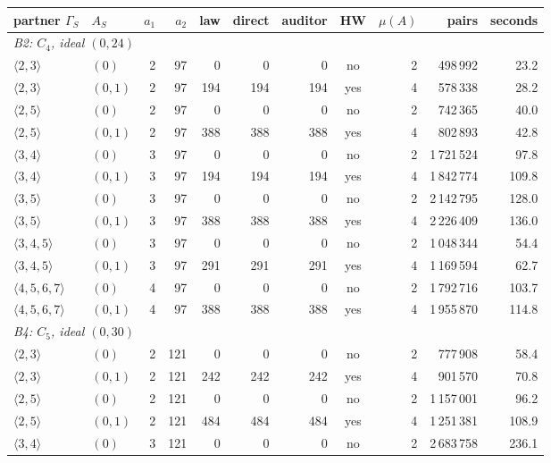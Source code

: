 \begin{tabular}{llrrrrrcrrr}
\toprule
partner $\Gamma_S$ & $A_S$ & $a_1$ & $a_2$ & law & direct & auditor & HW & $\mu(A)$ & pairs & seconds\\
\midrule
\multicolumn{11}{l}{\emph{B2: $C_4$, ideal $(0,24)$}}\\
$ \langle 2,3\rangle  $ & $(0)$ & 2 & 97 & 0 & 0 & 0 & no & 2 & 498\,992 & 23.2 \\
$ \langle 2,3\rangle  $ & $(0,1)$ & 2 & 97 & 194 & 194 & 194 & yes & 4 & 578\,338 & 28.2 \\
$ \langle 2,5\rangle  $ & $(0)$ & 2 & 97 & 0 & 0 & 0 & no & 2 & 742\,365 & 40.0 \\
$ \langle 2,5\rangle  $ & $(0,1)$ & 2 & 97 & 388 & 388 & 388 & yes & 4 & 802\,893 & 42.8 \\
$ \langle 3,4\rangle  $ & $(0)$ & 3 & 97 & 0 & 0 & 0 & no & 2 & 1\,721\,524 & 97.8 \\
$ \langle 3,4\rangle  $ & $(0,1)$ & 3 & 97 & 194 & 194 & 194 & yes & 4 & 1\,842\,774 & 109.8 \\
$ \langle 3,5\rangle  $ & $(0)$ & 3 & 97 & 0 & 0 & 0 & no & 2 & 2\,142\,795 & 128.0 \\
$ \langle 3,5\rangle  $ & $(0,1)$ & 3 & 97 & 388 & 388 & 388 & yes & 4 & 2\,226\,409 & 136.0 \\
$ \langle 3,4,5\rangle  $ & $(0)$ & 3 & 97 & 0 & 0 & 0 & no & 2 & 1\,048\,344 & 54.4 \\
$ \langle 3,4,5\rangle  $ & $(0,1)$ & 3 & 97 & 291 & 291 & 291 & yes & 4 & 1\,169\,594 & 62.7 \\
$ \langle 4,5,6,7\rangle  $ & $(0)$ & 4 & 97 & 0 & 0 & 0 & no & 2 & 1\,792\,716 & 103.7 \\
$ \langle 4,5,6,7\rangle  $ & $(0,1)$ & 4 & 97 & 388 & 388 & 388 & yes & 4 & 1\,955\,870 & 114.8 \\
\multicolumn{11}{l}{\emph{B4: $C_5$, ideal $(0,30)$}}\\
$ \langle 2,3\rangle  $ & $(0)$ & 2 & 121 & 0 & 0 & 0 & no & 2 & 777\,908 & 58.4 \\
$ \langle 2,3\rangle  $ & $(0,1)$ & 2 & 121 & 242 & 242 & 242 & yes & 4 & 901\,570 & 70.8 \\
$ \langle 2,5\rangle  $ & $(0)$ & 2 & 121 & 0 & 0 & 0 & no & 2 & 1\,157\,001 & 96.2 \\
$ \langle 2,5\rangle  $ & $(0,1)$ & 2 & 121 & 484 & 484 & 484 & yes & 4 & 1\,251\,381 & 108.9 \\
$ \langle 3,4\rangle  $ & $(0)$ & 3 & 121 & 0 & 0 & 0 & no & 2 & 2\,683\,758 & 236.1 \\

\end{tabular}
